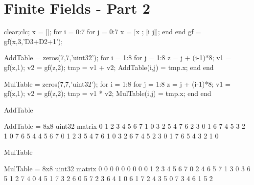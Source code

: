 \section{Finite Fields - Part 2}
\begin{matlabcode}
    clear;clc;
    x = [];
    for i = 0:7
        for j = 0:7
            x = [x ; [i j]];
        end
    end
    gf = gf(x,3,'D3+D2+1');
    
    AddTable = zeros(7,7,'uint32');
    for i = 1:8
        for j = 1:8
            z = j +  (i-1)*8;
            v1 = gf(z,1);
            v2 = gf(z,2);
            tmp = v1 + v2;
            AddTable(i,j) = tmp.x;
        end
    end
    
    MulTable = zeros(7,7,'uint32');
    for i = 1:8
        for j = 1:8
            z = j +  (i-1)*8;
            v1 = gf(z,1);
            v2 = gf(z,2);
            tmp = v1 * v2;
            MulTable(i,j) = tmp.x;
        end
    end
    
    AddTable
    \end{matlabcode}
    \begin{matlaboutput}
    AddTable = 8x8 uint32 matrix    
       0   1   2   3   4   5   6   7
       1   0   3   2   5   4   7   6
       2   3   0   1   6   7   4   5
       3   2   1   0   7   6   5   4
       4   5   6   7   0   1   2   3
       5   4   7   6   1   0   3   2
       6   7   4   5   2   3   0   1
       7   6   5   4   3   2   1   0
    
    \end{matlaboutput}
    \begin{matlabcode}
    MulTable
    \end{matlabcode}
    \begin{matlaboutput}
    MulTable = 8x8 uint32 matrix    
       0   0   0   0   0   0   0   0
       0   1   2   3   4   5   6   7
       0   2   4   6   5   7   1   3
       0   3   6   5   1   2   7   4
       0   4   5   1   7   3   2   6
       0   5   7   2   3   6   4   1
       0   6   1   7   2   4   3   5
       0   7   3   4   6   1   5   2
    
    \end{matlaboutput}
    \pagebreak